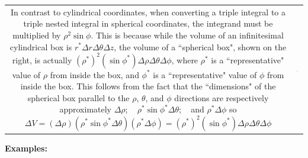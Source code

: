 \documentclass{article}
\begin{document}
\begin{tabular}{cc}
\parbox{0.5\textwidth}{
In contrast to cylindrical coordinates, when converting a triple integral to a triple nested integral in spherical coordinates, the integrand must be multiplied by \(\rho^2\sin\phi\). This is because while the volume of an infinitesimal cylindrical box is \(r^* \Delta r \Delta \theta \Delta z\), the volume of a ``spherical box", shown on the right, is actually \((\rho^*)^2 (\sin\phi^*) \Delta\rho \Delta \theta \Delta \phi\), where \(\rho^*\) is a ``representative" value of \(\rho\) from inside the box, and \(\phi^*\) is a ``representative" value of \(\phi\) from inside the box. This follows from the fact that the ``dimensions" of the spherical box parallel to the \(\rho\), \(\theta\), and \(\phi\) directions are respectively approximately \(\Delta \rho\); ~ \(\rho^*\sin\phi^* \Delta\theta\); ~ and \(\rho^* \Delta \phi\) so
\[\Delta V = (\Delta \rho)(\rho^*\sin\phi^* \Delta\theta)(\rho^* \Delta \phi) = (\rho^*)^2 (\sin\phi^*) \Delta\rho \Delta \theta \Delta \phi\]
} & \parbox{0.5\textwidth}{
\includegraphics[width = 0.5\textwidth]{spherical_box}
}
\end{tabular}

\textbf{Examples:}
\end{document}

